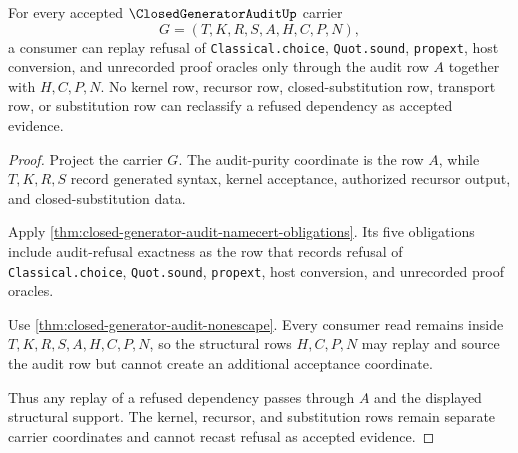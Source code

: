 \begin{theorem}
\label{thm:closed-generator-audit-refusal-replay-exactness}
For every accepted $\ClosedGeneratorAuditUp$ carrier
$$
G=(T,K,R,S,A,H,C,P,N),
$$
a consumer can replay refusal of \texttt{Classical.choice}, \texttt{Quot.sound}, \texttt{propext}, host conversion, and unrecorded proof oracles only through the audit row $A$ together with $H,C,P,N$. No kernel row, recursor row, closed-substitution row, transport row, or substitution row can reclassify a refused dependency as accepted evidence.
\end{theorem}
\begin{proof}
Project the carrier $G$. The audit-purity coordinate is the row $A$, while $T,K,R,S$ record generated syntax, kernel acceptance, authorized recursor output, and closed-substitution data.

Apply \autoref{thm:closed-generator-audit-namecert-obligations}. Its five obligations include audit-refusal exactness as the row that records refusal of \texttt{Classical.choice}, \texttt{Quot.sound}, \texttt{propext}, host conversion, and unrecorded proof oracles.

Use \autoref{thm:closed-generator-audit-nonescape}. Every consumer read remains inside $T,K,R,S,A,H,C,P,N$, so the structural rows $H,C,P,N$ may replay and source the audit row but cannot create an additional acceptance coordinate.

Thus any replay of a refused dependency passes through $A$ and the displayed structural support. The kernel, recursor, and substitution rows remain separate carrier coordinates and cannot recast refusal as accepted evidence.
\end{proof}

